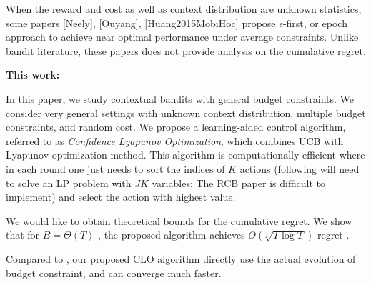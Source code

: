 When the reward and cost as well as context distribution are unknown statistics, some papers [Neely], [Ouyang], [Huang2015MobiHoc] propose $\epsilon$-first, or epoch approach to achieve near optimal performance under average constraints. Unlike bandit literature, these papers does not provide analysis on the cumulative regret.

\textbf{This work:}

In this paper, we study contextual bandits with general budget constraints. We consider very general settings with unknown context distribution, multiple budget constraints, and random cost.
We propose a learning-aided control algorithm, referred to as \emph{Confidence Lyapunov Optimization}, which combines UCB with Lyapunov optimization method. This algorithm is computationally efficient where in each round one just needs to  sort the indices of $K$ actions (following \cite{Wu2015NIPS:CCB} will need to solve an LP problem with $JK$ variables; The RCB paper \cite{Badanidiyuru2014COLT} is difficult to implement) and select the action with highest value.

We would like to obtain theoretical bounds for the cumulative regret. We show that for $B = \Theta(T)$ , the proposed algorithm achieves $O(\sqrt{T\log{T}})$ regret .



Compared to \cite{Agrawal2015TR:LCB}, our proposed CLO algorithm directly use the actual evolution of budget constraint, and can converge much faster.



%
%
%
%
%
